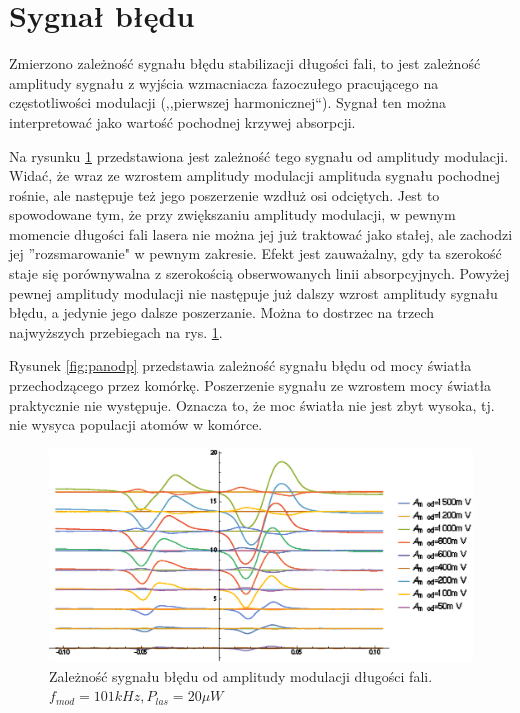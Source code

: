 \documentclass[a4paper,10pt]{article}
\begin{document}
\section{Sygnał błędu}

Zmierzono zależność sygnału błędu stabilizacji długości fali, to jest zależność amplitudy sygnału z wyjścia wzmacniacza fazoczułego pracującego na częstotliwości modulacji (,,pierwszej harmonicznej``). Sygnał ten można interpretować jako wartość pochodnej krzywej absorpcji.

Na rysunku \ref{fig:panoda} przedstawiona jest zależność tego sygnału od amplitudy modulacji. Widać, że wraz ze wzrostem amplitudy modulacji amplituda sygnału pochodnej rośnie, ale następuje też jego poszerzenie wzdłuż osi odciętych. Jest to spowodowane tym, że przy zwiększaniu amplitudy modulacji, w pewnym momencie długości fali lasera nie można jej już traktować jako stałej, ale zachodzi jej ''rozsmarowanie" w pewnym zakresie. Efekt jest zauważalny, gdy ta szerokość staje się porównywalna z szerokością obserwowanych linii absorpcyjnych. Powyżej pewnej amplitudy modulacji nie następuje już dalszy wzrost amplitudy sygnału błędu, a jedynie jego dalsze poszerzanie. Można to dostrzec na trzech najwyższych przebiegach na rys. \ref{fig:panoda}.

Rysunek \ref{fig:panodp} przedstawia zależność sygnału błędu od mocy światła przechodzącego przez komórkę. Poszerzenie sygnału ze wzrostem mocy światła praktycznie nie występuje. Oznacza to, że moc światła nie jest zbyt wysoka, tj. nie wysyca populacji atomów w komórce.


\begin{figure}[h!]
\centering
 \includegraphics[width=\textwidth]{panoramy_1H_oda.eps}
 \caption{Zależność sygnału błędu od amplitudy modulacji długości fali. $f_{mod}=101kHz, P_{las}=20 \mu W$}
 \label{fig:panoda}
\end{figure}
\end{document}
